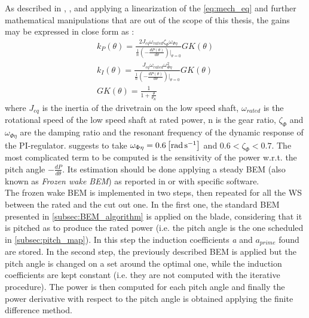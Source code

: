 As described in \cite{Aerodynamics_of_wind_turbines}, \cite{NREL_5MW_reference}, and \cite{ris_r_1500} applying a linearization of the \autoref{eq:mech_eq} and further mathematical manipulations that are out of the scope of this thesis,  the gains may be expressed in close form as :
\begin{gather}
    k_P(\theta) = \frac{2J_{eq}\omega_{rated}\zeta_{\Phi}\omega_{\Phi\eta}}{\frac{1}{n}\left(-\frac{dP(\theta)}{d\theta}\right)\vert_{\theta=0}}GK(\theta)
    \label{eq:kp}\\
    k_I(\theta) = \frac{J_{eq}\omega_{rated}\omega_{\Phi\eta}^2}{\frac{1}{n}\left(-\frac{dP(\theta)}{d\theta}\right)\vert_{\theta=0}}GK(\theta)
    \label{eq:ki}\\
    GK(\theta) = \frac{1}{1+\frac{\theta}{\theta_K}} \label{eq:GK}
\end{gather}
where $J_{eq}$ is the inertia of the drivetrain on the low speed shaft, $\omega_{rated}$ is the rotational speed of the low speed shaft at rated power, n is the gear ratio, $\zeta_{\Phi}$ and $\omega_{\Phi\eta}$ are the damping ratio and the resonant frequency of the dynamic response of the PI-regulator. \cite{NREL_5MW_reference} suggests to take $\omega_{\Phi\eta}=0.6\left[\si{\radian\per\second}\right]$ and $0.6<\zeta_{\Phi}<0.7$. The most complicated term to be computed is the sensitivity of the power w.r.t. the pitch angle $-\frac{dP}{d\theta}$. Its estimation should be done applying a steady \acrshort{BEM} (also known as \textit{Frozen wake BEM}) as reported in \cite{Aerodynamics_of_wind_turbines} or with specific software. \\
The frozen wake BEM is implemented in two steps, then repeated for all the \acrshort{WS} between the rated and the cut out one. In the first one, the standard BEM presented in \autoref{subsec:BEM_algorithm} is applied on the blade, considering that it is pitched as to produce the rated power (i.e. the pitch angle is the one scheduled in \autoref{subsec:pitch_map}). In this step the induction coefficients \textit{a} and \textit{$a_{prime}$} found are stored. In the second step, the previously described BEM is applied but the pitch angle is changed on a set around the optimal one, while the induction coefficients are kept constant (i.e. they are not computed with the iterative procedure). The power is then computed for each pitch angle and finally the power derivative with respect to the pitch angle is obtained applying the finite difference method.

